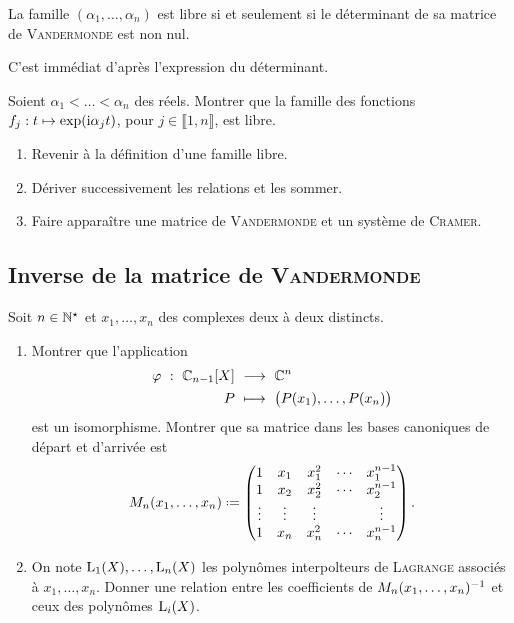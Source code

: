 \begin{corol}
    La famille $(\alpha_1, \dots, \alpha_n)$ est libre si et seulement si le déterminant de sa matrice de \textsc{Vandermonde} est non nul.
\end{corol}

\begin{preuve}
    C'est immédiat d'après l'expression du déterminant.
\end{preuve}

\begin{exercice}
    Soient $\alpha_1 < \dots < \alpha_n$ des réels. Montrer que la famille des fonctions $f_j:t \mapsto \exp(\mathrm{i} \alpha_j t)$, pour $j \in \llbracket 1,n \rrbracket$, est libre.
\end{exercice}

\begin{elem_sol}
    \begin{enumerate}
        \item Revenir à la définition d'une famille libre.
        \item Dériver successivement les relations et les sommer. 
        \item Faire apparaître une matrice de \textsc{Vandermonde} et un système de \textsc{Cramer}. 
    \end{enumerate}
\end{elem_sol}

\subsection{Inverse de la matrice de {\textsc{Vandermonde}}}

\begin{exercice}
    Soit $n \in \mathbb{N}^\star$ et $x_1, \dots, x_n$ des complexes deux à deux distincts.
    \begin{enumerate}
        \item Montrer que l'application
        \begin{alignat*}{2}
            \varphi\ :\ \mathbb{C}_{n-1}[X]\ &\longrightarrow\ \mathbb{C}^n\\
            P\ &\longmapsto\ \big( P(x_1), \dots, P(x_n) \big)
        \end{alignat*}
        est un isomorphisme. Montrer que sa matrice dans les bases canoniques de départ et d'arrivée est 
        $$
        M_n(x_1, \dots, x_n) \defeq
        \begin{pmatrix}
            1 & x_1 & x_1^2 & \cdots & x_1^{n-1} \\
            1 & x_2 & x_2^2 & \cdots & x_2^{n-1} \\
            \vdots & \vdots & \vdots & & \vdots \\
            1 & x_n & x_n^2 & \cdots & x_n^{n-1}
        \end{pmatrix}.
        $$
        \item On note $\mathrm{L}_1(X), \dots, \mathrm{L}_n(X)$ les polynômes interpolteurs de \textsc{Lagrange} associés à $x_1, \dots, x_n$. Donner une relation entre les coefficients de $M_n(x_1, \dots, x_n)^{-1}$ et ceux des polynômes $\mathrm{L}_i(X)$.
    \end{enumerate}
\end{exercice}
